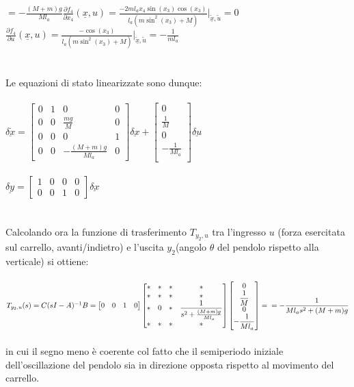 $=-\displaystyle\frac{(M+m)g}{Ml_a}$\qquad$\displaystyle\frac{\partial{f_4}}{\partial{x_4}}(\underline{x},u)=\displaystyle\frac{-2ml_ax_4\sin(x_3)\cos(x_3)}{l_a(m\sin^2(x_3)+M)}\bigg|_{\underline{\tilde{x}},\tilde{u}}=0$\\$\displaystyle\frac{\partial{f_4}}{\partial{u}}(\underline{x},u)=\displaystyle\frac{-\cos(x_3)}{l_a(m\sin^2(x_3)+M)}\bigg|_{\underline{\tilde{x}},\tilde{u}}=-\displaystyle\frac{1}{ml_a}$\\\\\\
Le equazioni di stato linearizzate sono dunque:\\\\
$\underline{\delta\dot{x}}=
\begin{bmatrix}
0&1&0&0\\
0&0&\displaystyle\frac{mg}{M}&0\\
0&0&0&1\\
0&0&-\displaystyle\frac{(M+m)g}{Ml_a}&0
\end{bmatrix}
\underline{\delta x}+
\begin{bmatrix}
0\\
\displaystyle\frac{1}{M}\\
0\\
-\displaystyle\frac{1}{Ml_a}\\
\end{bmatrix}
\underline{\delta u}
$\\\\
$\underline{\delta y}=
\begin{bmatrix}
1&0&0&0\\
0&0&1&0
\end{bmatrix}
\underline{\delta x}
$\\\\\\
Calcolando ora la funzione di trasferimento $T_{y_2,u}$ tra l'ingresso $u$ (forza esercitata sul carrello,
avanti/indietro) e l'uscita $y_2$(angolo $\theta$ del pendolo rispetto alla verticale) si ottiene:\\\\
$T_{y_2,u}(s)=C(sI-A)^{-1}B=
\begin{bmatrix}
0&0&1&0
\end{bmatrix}
\begin{bmatrix}
*&*&*&*\\
*&*&*&*\\
*&0&*&\displaystyle\frac{1}{s^2+\frac{(M+m)g}{Ml_a}}\\
*&*&*&*
\end{bmatrix}
\begin{bmatrix}
0\\
\displaystyle\frac{1}{M}\\
0\\
-\displaystyle\frac{1}{Ml_a}\\
\end{bmatrix} = \\
=-\displaystyle\frac{1}{Ml_as^2+(M+m)g}
$\\\\
in cui il segno meno è coerente col fatto che il semiperiodo iniziale dell'oscillazione del pendolo sia in direzione opposta rispetto al movimento del carrello.

